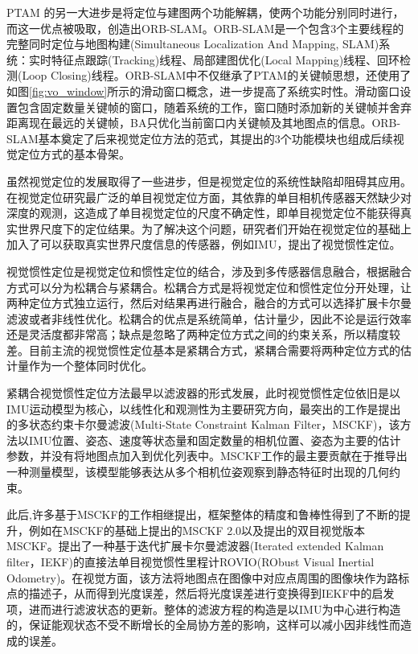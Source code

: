PTAM 的另一大进步是将定位与建图两个功能解耦，使两个功能分别同时进行，而这一优点被\citet{mur2015orb,mur2017orb}吸取，创造出ORB-SLAM。ORB-SLAM是一个包含3个主要线程的完整同时定位与地图构建(Simultaneous Localization And Mapping, SLAM)系统：实时特征点跟踪(Tracking)线程、局部建图优化(Local Mapping)线程、回环检测(Loop Closing)线程。ORB-SLAM中不仅继承了PTAM的关键帧思想，还使用了如图\ref{fig:vo_window}所示的滑动窗口概念，进一步提高了系统实时性。滑动窗口设置包含固定数量关键帧的窗口，随着系统的工作，窗口随时添加新的关键帧并舍弃距离现在最远的关键帧，BA只优化当前窗口内关键帧及其地图点的信息。ORB-SLAM基本奠定了后来视觉定位方法的范式，其提出的3个功能模块也组成后续视觉定位方式的基本骨架。

虽然视觉定位的发展取得了一些进步，但是视觉定位的系统性缺陷却阻碍其应用。在视觉定位研究最广泛的单目视觉定位方面，其依靠的单目相机传感器天然缺少对深度的观测，这造成了单目视觉定位的尺度不确定性，即单目视觉定位不能获得真实世界尺度下的定位结果。为了解决这个问题，研究者们开始在视觉定位的基础上加入了可以获取真实世界尺度信息的传感器，例如IMU，提出了视觉惯性定位。

视觉惯性定位是视觉定位和惯性定位的结合，涉及到多传感器信息融合，根据融合方式可以分为松耦合\cite{lynen2013robust}与紧耦合\cite{falquez2016inertial}。松耦合方式是将视觉定位和惯性定位分开处理，让两种定位方式独立运行，然后对结果再进行融合，融合的方式可以选择扩展卡尔曼滤波或者非线性优化。松耦合的优点是系统简单，估计量少，因此不论是运行效率还是灵活度都非常高；缺点是忽略了两种定位方式之间的约束关系，所以精度较差。目前主流的视觉惯性定位基本是紧耦合方式，紧耦合需要将两种定位方式的估计量作为一个整体同时优化。

紧耦合视觉惯性定位方法最早以滤波器的形式发展，此时视觉惯性定位依旧是以IMU运动模型为核心，以线性化和观测性为主要研究方向，最突出的工作是\citet{mourikis2007multi}提出的多状态约束卡尔曼滤波(Multi-State Constraint Kalman Filter，MSCKF)，该方法以IMU位置、姿态、速度等状态量和固定数量的相机位置、姿态为主要的估计参数，并没有将地图点加入到优化列表中。MSCKF工作的最主要贡献在于推导出一种测量模型，该模型能够表达从多个相机位姿观察到静态特征时出现的几何约束。

此后,许多基于MSCKF的工作相继提出，框架整体的精度和鲁棒性得到了不断的提升，例如\citet{li2013high}在MSCKF的基础上提出的MSCKF 2.0以及\citet{sun2018robust}提出的双目视觉版本MSCKF。\citet{bloesch2017iterated}提出了一种基于迭代扩展卡尔曼滤波器(Iterated extended Kalman filter，IEKF)的直接法单目视觉惯性里程计ROVIO(RObust Visual Inertial Odometry)。在视觉方面，该方法将地图点在图像中对应点周围的图像块作为路标点的描述子，从而得到光度误差，然后将光度误差进行变换得到IEKF中的启发项，进而进行滤波状态的更新。整体的滤波方程的构造是以IMU为中心进行构造的，保证能观状态不受不断增长的全局协方差的影响，这样可以减小因非线性而造成的误差。

